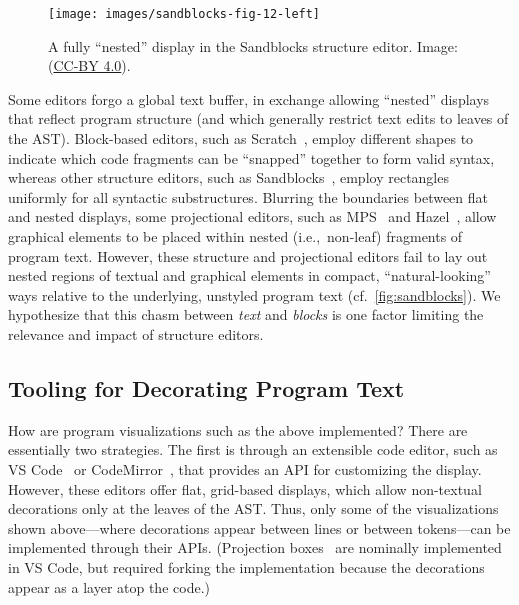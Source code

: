 \documentclass[acmsmall, screen]{acmart}
\newcommand{\vsCode}{VS Code}
\newcommand{\codeMirror}{CodeMirror}
\begin{document}
\begin{wrapfigure}[11]{r}{2.2in}
  \vspace{-0.02in} \texttt{[image: images/sandblocks-fig-12-left]}
  \caption{A fully ``nested'' display in the Sandblocks structure editor. Image: \citet[Fig.~12]{Beckmann2023} (\href{https://creativecommons.org/licenses/by/4.0/}{CC-BY 4.0}).}
  \label{fig:sandblocks}
\end{wrapfigure}
 Some editors forgo a global text buffer, in exchange allowing ``nested'' displays that reflect program structure (and which generally restrict text edits to leaves of the AST).
Block-based editors, such as Scratch~\cite{Resnick2009}, employ different shapes to indicate which code fragments can be ``snapped'' together to form valid syntax, whereas
other structure editors, such as Sandblocks~\cite{Beckmann2023}, employ rectangles uniformly for all syntactic substructures.
Blurring the boundaries between flat and nested displays, some projectional editors, such as MPS~\cite{MPS} and Hazel~\cite{Omar2021}, allow graphical elements to be placed within nested (i.e.,~non-leaf) fragments of program text.
However, these structure and projectional editors fail to lay out nested regions of textual and graphical elements in compact, ``natural-looking'' ways relative to the underlying, unstyled program text (cf.~\autoref{fig:sandblocks}).
We hypothesize that this chasm between \emph{text} and \emph{blocks} is one factor limiting the relevance and impact of structure editors.

\subsection{Tooling for Decorating Program Text}

How are program visualizations such as the above implemented?
There are essentially two strategies.
The first is through an extensible code editor, such as \vsCode{}~\cite{VSCode} or \codeMirror{}~\cite{CodeMirror}, that provides an API for customizing the display.
However, these editors offer flat, grid-based displays, which allow non-textual decorations only at the leaves of the AST.
Thus, only some of the visualizations shown above---where decorations appear between lines or between tokens---can be implemented through their APIs.
(Projection boxes~\cite{Lerner2020} are nominally implemented in \vsCode{}, but required forking the implementation because the decorations appear as a layer atop the code.)
\end{document}
